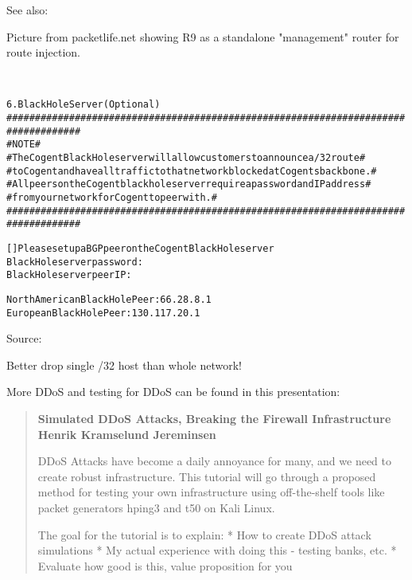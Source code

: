 \documentclass[Screen16to9,17pt]{foils}
\begin{document}
See also: {\small{}}



Picture from packetlife.net showing  R9 as a standalone "management" router for route injection.

{\footnotesize
{}\\
}



\begin{alltt}\footnotesize
6.  Black Hole Server (Optional)
   ###################################################################################
   #                           NOTE                                                  #
   #  The Cogent Black Hole server will allow customers to announce a /32 route      #
   #  to Cogent and have all traffic to that network blocked at Cogents backbone.    #
   #  All peers on the Cogent black hole server require a password and IP address    #
   #  from your network for Cogent to peer with.                                     #
   ###################################################################################

       [   ]  Please set up a BGP peer on the Cogent Black Hole server
       Black Hole server password:
       Black Hole server peer IP:

       North American Black Hole Peer:  66.28.8.1
       European Black Hole Peer:  130.117.20.1
\end{alltt}

Source:\\
{\footnotesize{}}

\centerline{Better drop single /32 host than whole network!}


More DDoS and testing for DDoS can be found in this presentation:
\begin{quote}\footnotesize{\bf
Simulated DDoS Attacks, Breaking the Firewall Infrastructure
Henrik Kramselund Jereminsen}

DDoS Attacks have become a daily annoyance for many, and we need to create robust infrastructure. This tutorial will go through a proposed method for testing your own infrastructure using off-the-shelf tools like packet generators hping3 and t50 on Kali Linux.

The goal for the tutorial is to explain:
* How to create DDoS attack simulations
* My actual experience with doing this - testing banks, etc.
* Evaluate how good is this, value proposition for you
\end{quote}
\end{document}
